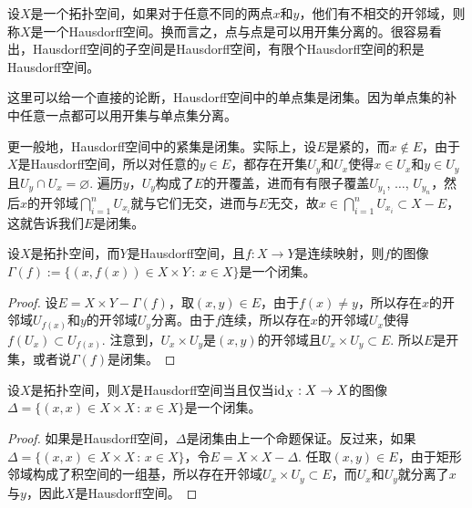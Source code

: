 \begin{para}
设$X$是一个拓扑空间，如果对于任意不同的两点$x$和$y$，他们有不相交的开邻域，则称$X$是一个Hausdorff空间。换而言之，点与点是可以用开集分离的。很容易看出，Hausdorff空间的子空间是Hausdorff空间，有限个Hausdorff空间的积是Hausdorff空间。

这里可以给一个直接的论断，Hausdorff空间中的单点集是闭集。因为单点集的补中任意一点都可以用开集与单点集分离。

更一般地，Hausdorff空间中的紧集是闭集。实际上，设$E$是紧的，而$x\not\in E$，由于$X$是Hausdorff空间，所以对任意的$y\in E$，都存在开集$U_y$和$U_x$使得$x\in U_x$和$y\in U_y$且$U_y\cap U_x=\varnothing$. 遍历$y$，$U_y$构成了$E$的开覆盖，进而有有限子覆盖$U_{y_1}$, $\dots$, $U_{y_n}$，然后$x$的开邻域$\bigcap_{i=1}^n U_{x_i}$就与它们无交，进而与$E$无交，故$x\in \bigcap_{i=1}^n U_{x_i}\subset X-E$，这就告诉我们$E$是闭集。
\end{para}

\begin{pro}
设$X$是拓扑空间，而$Y$是Hausdorff空间，且$f:X\to Y$是连续映射，则$f$的图像$\Gamma(f):=\{(x,f(x))\in X\times Y\,:\, x\in X\}$是一个闭集。
\end{pro}

\begin{proof}
设$E=X\times Y- \Gamma(f)$，取$(x,y)\in E$，由于$f(x)\neq y$，所以存在$x$的开邻域$U_{f(x)}$和$y$的开邻域$U_y$分离。由于$f$连续，所以存在$x$的开邻域$U_x$使得$f(U_x)\subset U_{f(x)}$. 注意到，$U_x\times U_y$是$(x,y)$的开邻域且$U_x\times U_y\subset E$. 所以$E$是开集，或者说$\Gamma(f)$是闭集。
\end{proof}

\begin{pro}\label{pro.1.4}
设$X$是拓扑空间，则$X$是Hausdorff空间当且仅当$\operatorname{id}_X:X\to X$的图像$\Delta=\{(x,x)\in X\times X\,:\, x\in X\}$是一个闭集。
\end{pro}

\begin{proof}
如果是Hausdorff空间，$\Delta$是闭集由上一个命题保证。反过来，如果$\Delta=\{(x,x)\in X\times X\,:\, x\in X\}$，令$E=X\times X-\Delta$. 任取$(x,y)\in E$，由于矩形邻域构成了积空间的一组基，所以存在开邻域$U_x\times U_y\subset E$，而$U_x$和$U_y$就分离了$x$与$y$，因此$X$是Hausdorff空间。
\end{proof}

